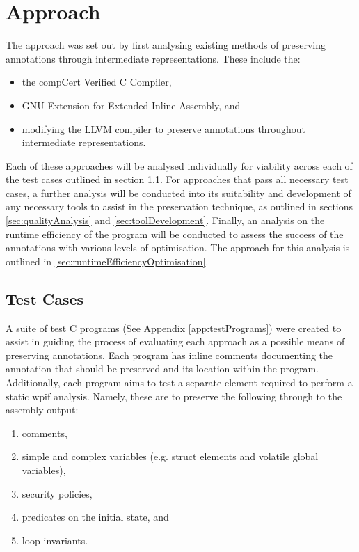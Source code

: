 \chapter{Approach}
The approach was set out by first analysing existing methods of preserving annotations through intermediate representations. These include the:
\begin{itemize}
    \item the compCert Verified C Compiler, 
    \item GNU Extension for Extended Inline Assembly, and
    \item modifying the LLVM compiler to preserve annotations throughout intermediate representations.
\end{itemize}

Each of these approaches will be analysed individually for viability across each of the test cases outlined in section \ref{sec:testCases}. For approaches that pass all necessary test cases, a further analysis will be conducted into its suitability and development of any necessary tools to assist in the preservation technique, as outlined in sections \ref{sec:qualityAnalysis} and \ref{sec:toolDevelopment}. Finally, an analysis on the runtime efficiency of the program will be conducted to assess the success of the annotations with various levels of optimisation. The approach for this analysis is outlined in \ref{sec:runtimeEfficiencyOptimisation}.

\section{Test Cases}
\label{sec:testCases}
A suite of test C programs (See Appendix \ref{app:testPrograms}) were created to assist in guiding the process of evaluating each approach as a possible means of preserving annotations. Each program has inline comments documenting the annotation that should be preserved and its location within the program. Additionally, each program aims to test a separate element required to perform a static wpif analysis. Namely, these are to preserve the following through to the assembly output:

\begin{enumerate}
    \item comments,
    \item simple and complex variables (e.g. struct elements and volatile global variables),
    \item security policies,
    \item predicates on the initial state, and
    \item loop invariants.
\end{enumerate}

